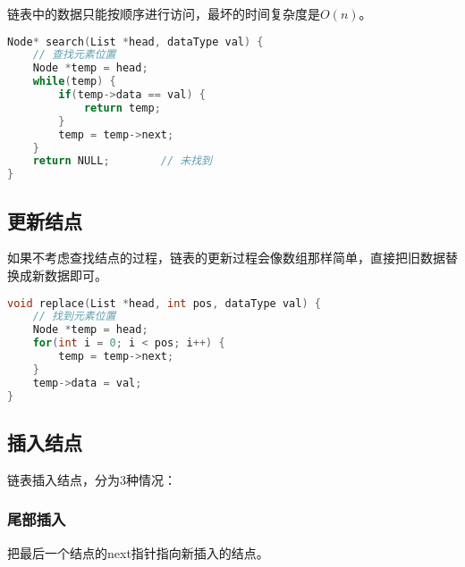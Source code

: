链表中的数据只能按顺序进行访问，最坏的时间复杂度是$ O(n) $。\\


\begin{lstlisting}[language=C]
Node* search(List *head, dataType val) {
    // 查找元素位置
    Node *temp = head;
    while(temp) {
        if(temp->data == val) {
            return temp;
        }
        temp = temp->next;
    }
    return NULL;        // 未找到
}
\end{lstlisting}

\vspace{0.5cm}

\subsection{更新结点}

如果不考虑查找结点的过程，链表的更新过程会像数组那样简单，直接把旧数据替换成新数据即可。\\


\begin{lstlisting}[language=C]
void replace(List *head, int pos, dataType val) {
    // 找到元素位置
    Node *temp = head;
    for(int i = 0; i < pos; i++) {
        temp = temp->next;
    }
    temp->data = val;
}
\end{lstlisting}

\vspace{0.5cm}

\subsection{插入结点}

链表插入结点，分为3种情况：

\subsubsection{尾部插入}

把最后一个结点的next指针指向新插入的结点。

